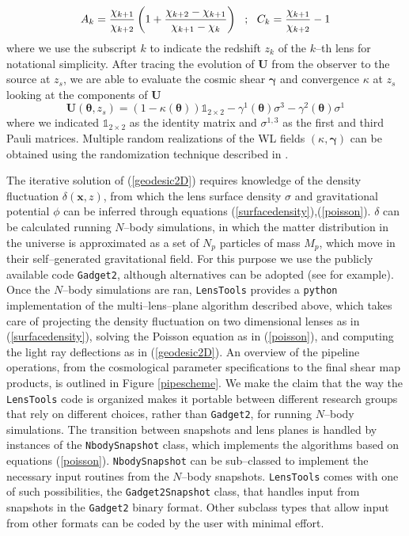\documentclass[reprint,aps,prd,superscriptaddress,showkeys,showpacs]{revtex4-1}
\newcommand{\bb}[1]{\mathbf{#1}}
\newcommand{\ttt}[1]{\texttt{#1}}
\newcommand{\LT}{\texttt{LensTools} }
\begin{document}
\begin{equation}
A_k = \frac{\chi_{k+1}}{\chi_{k+2}}\left(1 + \frac{\chi_{k+2}-\chi_{k+1}}{\chi_{k+1}-\chi_k}\right) \,\,\,\, ; \,\,\,\, C_k = \frac{\chi_{k+1}}{\chi_{k+2}} - 1 \\ \\
\end{equation} 
%
where we use the subscript $k$ to indicate the redshift $z_k$ of the $k$--th lens for notational simplicity. After tracing the evolution of $\bb{U}$ from the observer to the source at $z_s$, we are able to evaluate the cosmic shear $\pmb{\gamma}$ and convergence $\kappa$ at $z_s$ looking at the components of $\bb{U}$
\begin{equation}
\bb{U}(\pmb{\theta},z_s) = (1-\kappa(\pmb{\theta}))\mathds{1}_{2\times2} - \gamma^1(\pmb{\theta})\sigma^3 - \gamma^2(\pmb{\theta})\sigma^1
\end{equation}
%
where we indicated $\mathds{1}_{2\times2}$ as the identity matrix and $\sigma^{1,3}$ as the first and third Pauli matrices. Multiple random realizations of the WL fields $(\kappa,\pmb{\gamma})$ can be obtained using the randomization technique described in \citep{Petri16}.

The iterative solution of (\ref{geodesic2D}) requires knowledge of the density fluctuation $\delta(\bb{x},z)$, from which the lens surface density $\sigma$ and gravitational potential $\phi$ can be inferred through equations (\ref{surfacedensity}),(\ref{poisson}). $\delta$ can be calculated running $N$--body simulations, in which the matter distribution in the universe is approximated as a set of $N_p$ particles of mass $M_p$, which move in their self--generated gravitational field. For this purpose we use the publicly available code \ttt{Gadget2}\citep{Gadget2}, although alternatives can be adopted (see \citep{HACC} for example). Once the $N$--body simulations are ran, \LT provides a \ttt{python} implementation of the multi--lens--plane algorithm \citep{RayTracingHartlap} described above, which takes care of projecting the density fluctuation on two dimensional lenses as in (\ref{surfacedensity}), solving the Poisson equation as in (\ref{poisson}), and computing the light ray deflections as in (\ref{geodesic2D}). An overview of the pipeline operations, from the cosmological parameter specifications to the final shear map products, is outlined in Figure \ref{pipescheme}. We make the claim that the way the \LT code is organized makes it portable between different research groups that rely on different choices, rather than \ttt{Gadget2}, for running $N$--body simulations. The transition between snapshots and lens planes is handled by instances of the \ttt{NbodySnapshot} class, which implements the algorithms based on equations (\ref{poisson}). \ttt{NbodySnapshot} can be sub--classed to implement the necessary input routines from the $N$--body snapshots. \LT comes with one of such possibilities, the \ttt{Gadget2Snapshot} class, that handles input from snapshots in the \ttt{Gadget2} binary format. Other subclass types that allow input from other formats can be coded by the user with minimal effort.  
\end{document}
